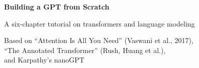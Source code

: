 


\begin{titlepage}
\centering
\vspace*{4cm}
{\Huge\bfseries Building a GPT from Scratch\par}
\vspace{1.5cm}
{\Large A six-chapter tutorial on transformers and language modeling\par}
\vspace{2cm}
{\large Based on ``Attention Is All You Need'' (Vaswani et al., 2017),\\
``The Annotated Transformer'' (Rush, Huang et al.),\\
and Karpathy's nanoGPT\par}
\vfill
\end{titlepage}

\tableofcontents









